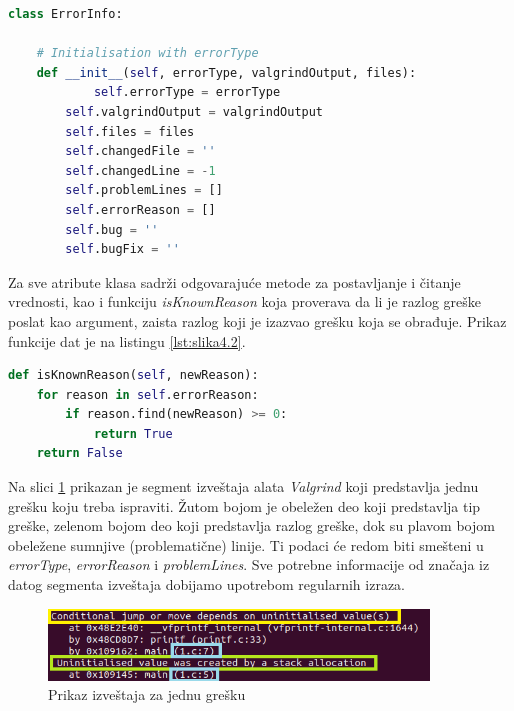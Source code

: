 \documentclass[12pt,oneside]{memoir}
\theoremstyle{plain}
\theoremstyle{definition}
\begin{document}
\begin{lstlisting}[style=mystyle,caption={Potpis klase \textit{ErrorInfo}}, label={lst:slika4.1},language={Python}] 
class ErrorInfo:

	# Initialisation with errorType
	def __init__(self, errorType, valgrindOutput, files):
        	self.errorType = errorType
		self.valgrindOutput = valgrindOutput
		self.files = files
		self.changedFile = ''
		self.changedLine = -1
		self.problemLines = []
		self.errorReason = []
		self.bug = ''
		self.bugFix = ''
\end{lstlisting}

Za sve atribute klasa sadrži odgovarajuće metode za postavljanje i čitanje vrednosti, kao i funkciju  \textit{isKnownReason} koja proverava da li je razlog greške poslat kao argument, zaista razlog koji je izazvao grešku koja se obrađuje. Prikaz funkcije dat je na listingu \ref{lst:slika4.2}.

\begin{lstlisting}[style=mystyle,caption={Prikaz funkcije koja proverava validnost razloga greške}, label={lst:slika4.2},language={Python}] 
def isKnownReason(self, newReason):
	for reason in self.errorReason:
		if reason.find(newReason) >= 0:
			return True
	return False
\end{lstlisting}


Na slici \ref{fig:slika4.3} prikazan je segment izveštaja alata \textit{Valgrind} koji predstavlja jednu grešku koju treba ispraviti. Žutom bojom je obeležen deo koji predstavlja tip greške, zelenom bojom deo koji predstavlja razlog greške, dok su plavom bojom obeležene sumnjive (problematične) linije. Ti podaci će redom biti smešteni u \textit{errorType}, \textit{errorReason} i \textit{problemLines}. Sve potrebne informacije od značaja iz datog segmenta izveštaja dobijamo upotrebom regularnih izraza.

\begin{figure}[!ht]
  \centering
  \includegraphics[width=0.9\textwidth]{ErrorClassExplaination.png}
  \caption{Prikaz izveštaja za jednu grešku}
  \label{fig:slika4.3}
\end{figure}
\end{document}
